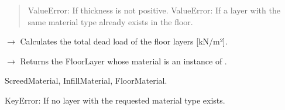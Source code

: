 \documentclass[a4paper,11pt,german]{sphinxmanual}
\begin{document}
\begin{fulllineitems}
\begin{fulllineitems}
\begin{quote}
\sphinxAtStartPar
ValueError: If thickness is not positive.
ValueError: If a layer with the same material type already exists in the floor.
\end{quote}

\end{fulllineitems}


\begin{fulllineitems}
\label{\detokenize{api/slab_construction:slab_construction.floor.Floor.dead_load}}
\pysigstartsignatures
\pysiglinewithargsret
{}
{}
{{ $\rightarrow$ }}
\pysigstopsignatures
\sphinxAtStartPar
Calculates the total dead load of the floor layers {[}kN/m²{]}.

\end{fulllineitems}


\begin{fulllineitems}
\label{\detokenize{api/slab_construction:slab_construction.floor.Floor.get_layer_by_type}}
\pysigstartsignatures
\pysiglinewithargsret
{}
{}
{{ $\rightarrow$ {\hyperref[\detokenize{api/slab_construction:slab_construction.floor.FloorLayer}]{}}}}
\pysigstopsignatures
\sphinxAtStartPar
Returns the FloorLayer whose material is an instance of .
\begin{description}
\begin{description}
\sphinxAtStartPar
ScreedMaterial, InfillMaterial, FloorMaterial.

\end{description}

\sphinxAtStartPar
KeyError: If no layer with the requested material type exists.

\end{description}

\end{fulllineitems}


\end{fulllineitems}
\end{document}
